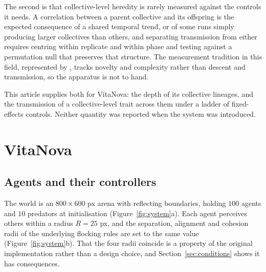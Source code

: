 \documentclass{artificial-life}
\begin{document}
The second is that collective-level heredity is rarely measured against the
controls it needs. A correlation between a parent collective and its offspring
is the expected consequence of a shared temporal trend, or of some runs simply
producing larger collectives than others, and separating transmission from
either requires centring within replicate and within phase and testing against a
permutation null that preserves that structure. The measurement tradition in
this field, represented by \citet{dolson2019modes}, tracks novelty and
complexity rather than descent and transmission, so the apparatus is not to
hand.

This article supplies both for VitaNova: the depth of its collective lineages,
and the transmission of a collective-level trait across them under a ladder of
fixed-effects controls. Neither quantity was reported when the system was
introduced.


\section{VitaNova}
\label{sec:model}

\subsection{Agents and their controllers}

The world is an $800 \times 600$ px arena with reflecting boundaries, holding
$100$ agents and $10$ predators at initialisation (Figure~\ref{fig:system}a).
Each agent perceives others within a radius $R = 25$ px, and the separation,
alignment and cohesion radii of the underlying flocking rules
\citep{reynolds1987flocks} are set to the same value
(Figure~\ref{fig:system}b). That the four radii coincide is a property of the
original implementation rather than a design choice, and
Section~\ref{sec:conditions} shows it has consequences.
\end{document}
